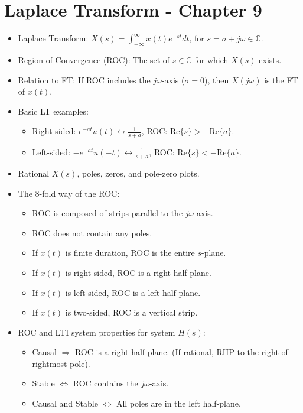 \documentclass[10pt, twocolumn]{article}
\begin{document}
\section{Laplace Transform - Chapter 9}
\begin{itemize}
    \item Laplace Transform: $X(s) = \int_{-\infty}^{\infty} x(t)e^{-st}dt$, for $s=\sigma+j\omega \in \mathbb{C}$.
    \item Region of Convergence (ROC): The set of $s \in \mathbb{C}$ for which $X(s)$ exists.
    \item Relation to FT: If ROC includes the $j\omega$-axis ($\sigma=0$), then $X(j\omega)$ is the FT of $x(t)$.
    \item Basic LT examples:
        \begin{itemize}
            \item Right-sided: $e^{-at}u(t) \leftrightarrow \frac{1}{s+a}$, ROC: Re$\{s\} > -\text{Re}\{a\}$.
            \item Left-sided: $-e^{-at}u(-t) \leftrightarrow \frac{1}{s+a}$, ROC: Re$\{s\} < -\text{Re}\{a\}$.
        \end{itemize}
    \item Rational $X(s)$, poles, zeros, and pole-zero plots.
    \item The 8-fold way of the ROC:
        \begin{itemize}
            \item ROC is composed of strips parallel to the $j\omega$-axis.
            \item ROC does not contain any poles.
            \item If $x(t)$ is finite duration, ROC is the entire $s$-plane.
            \item If $x(t)$ is right-sided, ROC is a right half-plane.
            \item If $x(t)$ is left-sided, ROC is a left half-plane.
            \item If $x(t)$ is two-sided, ROC is a vertical strip.
        \end{itemize}
    \item ROC and LTI system properties for system $H(s)$:
        \begin{itemize}
            \item Causal $\Rightarrow$ ROC is a right half-plane. (If rational, RHP to the right of rightmost pole).
            \item Stable $\Leftrightarrow$ ROC contains the $j\omega$-axis.
            \item Causal and Stable $\Leftrightarrow$ All poles are in the left half-plane.

\end{itemize}
\end{itemize}
\end{document}
